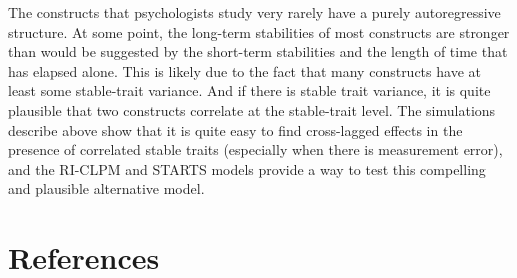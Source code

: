 \documentclass[
  english,
  man,floatsintext]{apa6}
\begin{document}
The constructs that psychologists study very rarely have a purely autoregressive structure. At some point, the long-term stabilities of most constructs are stronger than would be suggested by the short-term stabilities and the length of time that has elapsed alone. This is likely due to the fact that many constructs have at least some stable-trait variance. And if there is stable trait variance, it is quite plausible that two constructs correlate at the stable-trait level. The simulations describe above show that it is quite easy to find cross-lagged effects in the presence of correlated stable traits (especially when there is measurement error), and the RI-CLPM and STARTS models provide a way to test this compelling and plausible alternative model.

\hypertarget{references}{%
\section*{References}\label{references}}
\end{document}
